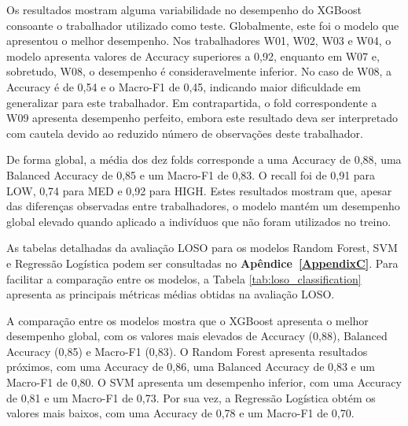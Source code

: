 Os resultados mostram alguma variabilidade no desempenho do XGBoost consoante o trabalhador utilizado como teste. Globalmente, este foi o modelo que apresentou o melhor desempenho. Nos trabalhadores W01, W02, W03 e W04, o modelo apresenta valores de Accuracy superiores a 0,92, enquanto em W07 e, sobretudo, W08, o desempenho é consideravelmente inferior. No caso de W08, a Accuracy é de 0,54 e o Macro-F1 de 0,45, indicando maior dificuldade em generalizar para este trabalhador. Em contrapartida, o fold correspondente a W09 apresenta desempenho perfeito, embora este resultado deva ser interpretado com cautela devido ao reduzido número de observações deste trabalhador.

De forma global, a média dos dez folds corresponde a uma Accuracy de 0,88, uma Balanced Accuracy de 0,85 e um Macro-F1 de 0,83. O recall foi de 0,91 para LOW, 0,74 para MED e 0,92 para HIGH. Estes resultados mostram que, apesar das diferenças observadas entre trabalhadores, o modelo mantém um desempenho global elevado quando aplicado a indivíduos que não foram utilizados no treino.

As tabelas detalhadas da avaliação LOSO para os modelos Random Forest, SVM e Regressão Logística podem ser consultadas no \textbf{Apêndice~\ref{AppendixC}}. Para facilitar a comparação entre os modelos, a Tabela \ref{tab:loso_classification} apresenta as principais métricas médias obtidas na avaliação LOSO.

\begin{table}[H]
\centering
\caption{Médias globais dos modelos de classificação da avaliação LOSO.}
\label{tab:loso_classification}
%
\end{table}

A comparação entre os modelos mostra que o XGBoost apresenta o melhor desempenho global, com os valores mais elevados de Accuracy (0,88), Balanced Accuracy (0,85) e Macro-F1 (0,83). O Random Forest apresenta resultados próximos, com uma Accuracy de 0,86, uma Balanced Accuracy de 0,83 e um Macro-F1 de 0,80. O SVM apresenta um desempenho inferior, com uma Accuracy de 0,81 e um Macro-F1 de 0,73. Por sua vez, a Regressão Logística obtém os valores mais baixos, com uma Accuracy de 0,78 e um Macro-F1 de 0,70.

